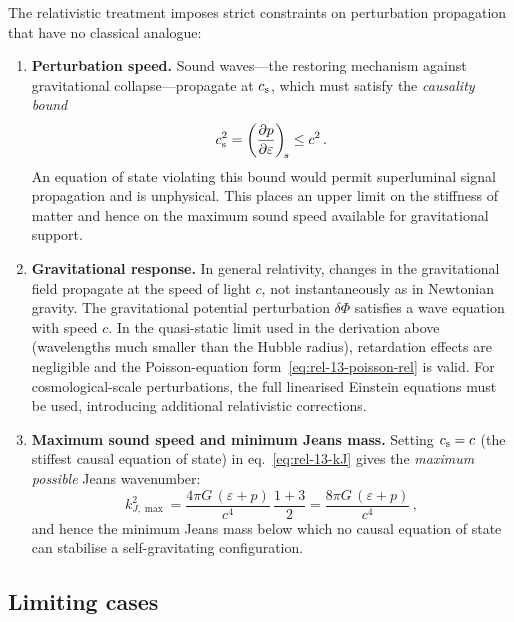 The relativistic treatment imposes strict constraints on
perturbation propagation that have no classical analogue:

\begin{enumerate}
\item \textbf{Perturbation speed.}  Sound waves---the restoring
  mechanism against gravitational collapse---propagate at
  $c_{\mathrm{s}}$, which must satisfy the \emph{causality bound}
  \begin{equation}
  \label{eq:rel-13-causality-cs}
    c_{\mathrm{s}}^{2}
    = \biggl(\frac{\partial p}{\partial\varepsilon}\biggr)_{\!s}
    \leq c^{2}\,.
  \end{equation}
  An equation of state violating this bound would permit
  superluminal signal propagation and is unphysical.  This places
  an upper limit on the stiffness of matter and hence on the
  maximum sound speed available for gravitational support.

\item \textbf{Gravitational response.}  In general relativity,
  changes in the gravitational field propagate at the speed of
  light $c$, not instantaneously as in Newtonian gravity.  The
  gravitational potential perturbation $\delta\Phi$ satisfies a
  wave equation with speed $c$.  In the quasi-static limit used
  in the derivation above (wavelengths much smaller than the
  Hubble radius), retardation effects are negligible and the
  Poisson-equation form~\eqref{eq:rel-13-poisson-rel} is valid.
  For cosmological-scale perturbations, the full linearised
  Einstein equations must be used, introducing additional
  relativistic corrections.

\item \textbf{Maximum sound speed and minimum Jeans mass.}
  Setting $c_{\mathrm{s}} = c$ (the stiffest causal equation of state) in
  eq.~\eqref{eq:rel-13-kJ} gives the \emph{maximum possible}
  Jeans wavenumber:
  \begin{equation}
  \label{eq:rel-13-kJ-max}
    k_{J,\max}^{2}
    = \frac{4\pi G\,(\varepsilon + p)}{c^{4}}\,
      \frac{1 + 3}{2}
    = \frac{8\pi G\,(\varepsilon + p)}{c^{4}}\,,
  \end{equation}
  and hence the minimum Jeans mass below which no causal equation
  of state can stabilise a self-gravitating configuration.
\end{enumerate}

\subsection{Limiting cases}
\label{sec:rel-13-119h}

